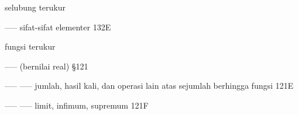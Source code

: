 


















\indexmedskip





















































selubung terukur

----- sifat-sifat elementer 132E



fungsi terukur

----- (bernilai real) \S121

----- ----- jumlah, hasil kali, dan operasi lain atas sejumlah berhingga fungsi 121E

----- ----- limit, infimum, supremum 121F



























